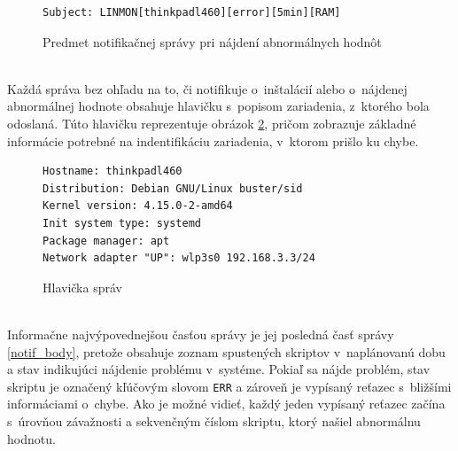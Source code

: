 \def\FV@BeginVBox{%
	\leavevmode\ifFV@bgcolor\setbox\FV@bgbox=\fi
	\hbox\ifx\FV@boxwidth\relax\else to\FV@boxwidth\fi\bgroup
	\ifcase\FV@baseline\vbox\or\vtop\or$\vcenter\fi\bgroup}
\def\FV@EndVBox{\egroup\ifmmode$\fi\hfil\egroup
	\ifFV@bgcolor\colorbox{\FV@bgcolor}{\box\FV@bgbox}\fi}
\makeatother
\begin{figure}[H]
\small
\centering
\begin{BVerbatim}[bgcolor=mygray]
Subject: LINMON[thinkpadl460][error][5min][RAM]
\end{BVerbatim}

\caption{Predmet notifikačnej správy pri nájdení abnormálnych hodnôt}
\label{notif_subj}
\end{figure} 
\hfill\\
\noindent Každá správa bez ohľadu na to, či notifikuje o~inštalácií alebo o~nájdenej abnormálnej hodnote obsahuje hlavičku s~popisom zariadenia, z~ktorého bola odoslaná. Túto hlavičku reprezentuje obrázok \ref{notif_header}, pričom  zobrazuje základné informácie potrebné na indentifikáciu zariadenia, v~ktorom prišlo ku chybe.
\\
\begin{figure}[H]
\centering
\small
\begin{BVerbatim}
Hostname: thinkpadl460
Distribution: Debian GNU/Linux buster/sid
Kernel version: 4.15.0-2-amd64
Init system type: systemd
Package manager: apt
Network adapter "UP": wlp3s0 192.168.3.3/24
\end{BVerbatim}
\caption{Hlavička správ}
\label{notif_header}
\end{figure} 
\normalsize
\hfill\\
\noindent Informačne najvýpovednejšou časťou správy je jej posledná časť správy \ref{notif_body}, pretože obsahuje zoznam spustených skriptov v~naplánovanú dobu a stav indikujúci nájdenie problému v~systéme. Pokiaľ sa nájde problém, stav skriptu je označený kľúčovým slovom \texttt{ERR} a zároveň je vypísaný reťazec s~bližšími informáciami o~chybe. Ako je možné vidieť, každý jeden vypísaný reťazec začína s~úrovňou závažnosti a sekvenčným číslom skriptu, ktorý našiel abnormálnu hodnotu.
\\
